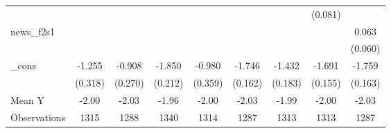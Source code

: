 {\begin{tabular}{l*{8}{c}}
            &                     &                     &                     &                     &                     &                     &     (0.081)         &                     \\
\addlinespace
news\_f2s1   &                     &                     &                     &                     &                     &                     &                     &       0.063         \\
            &                     &                     &                     &                     &                     &                     &                     &     (0.060)         \\
\addlinespace
\_cons      &      -1.255\sym{***}&      -0.908\sym{***}&      -1.850\sym{***}&      -0.980\sym{***}&      -1.746\sym{***}&      -1.432\sym{***}&      -1.691\sym{***}&      -1.759\sym{***}\\
            &     (0.318)         &     (0.270)         &     (0.212)         &     (0.359)         &     (0.162)         &     (0.183)         &     (0.155)         &     (0.163)         \\
\midrule
Mean Y      &       -2.00         &       -2.03         &       -1.96         &       -2.00         &       -2.03         &       -1.99         &       -2.00         &       -2.03         \\
Observations&        1315         &        1288         &        1340         &        1314         &        1287         &        1313         &        1313         &        1287         \\
\bottomrule
\end{tabular}
}
